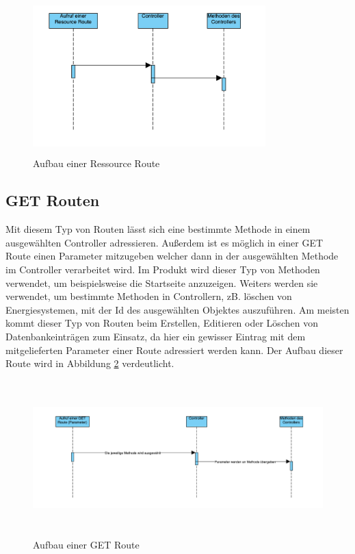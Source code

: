 \begin{figure}[h]
	\centering
	\includegraphics[height=6cm,width=9cm]{images/ResourceRoute}
	\caption{Aufbau einer Ressource Route}
	\label{fig:ResourceRoute}
\end{figure}

\subsection{GET Routen}
Mit diesem Typ von Routen lässt sich eine bestimmte Methode in einem ausgewählten Controller adressieren. Außerdem ist es möglich in einer GET Route einen Parameter mitzugeben welcher dann in der ausgewählten Methode im Controller verarbeitet wird. Im Produkt wird dieser Typ von Methoden verwendet, um beispielsweise die Startseite anzuzeigen. Weiters werden sie verwendet, um bestimmte Methoden in Controllern, zB. löschen von Energiesystemen, mit der Id des ausgewählten Objektes auszuführen. Am meisten kommt dieser Typ von Routen beim Erstellen, Editieren oder Löschen von Datenbankeinträgen zum Einsatz, da hier ein gewisser Eintrag mit dem mitgelieferten Parameter einer Route adressiert werden kann. Der Aufbau dieser Route wird in Abbildung \ref{fig:GETRoute} verdeutlicht.


\begin{figure}[h]
	\centering
	\includegraphics[height=6cm,width=16cm]{images/GETRoute}
	\caption{Aufbau einer GET Route}
	\label{fig:GETRoute}
\end{figure}
\newpage

